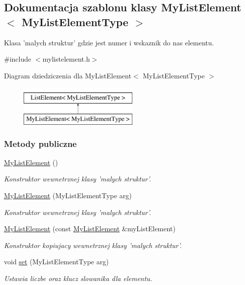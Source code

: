 \hypertarget{class_my_list_element}{\subsection{Dokumentacja szablonu klasy My\-List\-Element$<$ My\-List\-Element\-Type $>$}
\label{class_my_list_element}
}


Klasa 'malych struktur' gdzie jest numer i wskaznik do nas elementu.  




{\ttfamily \#include $<$mylistelement.\-h$>$}

Diagram dziedziczenia dla My\-List\-Element$<$ My\-List\-Element\-Type $>$\begin{figure}[H]
\begin{center}
\leavevmode
\includegraphics[height=2.000000cm]{class_my_list_element}
\end{center}
\end{figure}
\subsubsection*{Metody publiczne}
\begin{DoxyCompactItemize}
\item 
\hyperlink{class_my_list_element_aa29e333d56f5d89abb204c7b68b036ba}{My\-List\-Element} ()
\begin{DoxyCompactList}\small\item\em Konstruktor wewnetrznej klasy 'malych struktur'. \end{DoxyCompactList}\item 
\hyperlink{class_my_list_element_ab5020e69556fc9cb03741e8208d11658}{My\-List\-Element} (My\-List\-Element\-Type arg)
\begin{DoxyCompactList}\small\item\em Konstruktor wewnetrznej klasy 'malych struktur'. \end{DoxyCompactList}\item 
\hyperlink{class_my_list_element_a250d7ebabc90be7274c1337abf83a70f}{My\-List\-Element} (const \hyperlink{class_my_list_element}{My\-List\-Element} \&my\-List\-Element)
\begin{DoxyCompactList}\small\item\em Konstruktor kopiujacy wewnetrznej klasy 'malych struktur'. \end{DoxyCompactList}\item 
void \hyperlink{class_my_list_element_a40450b8318abf532f299f267a3abd504}{set} (My\-List\-Element\-Type arg)
\begin{DoxyCompactList}\small\item\em Ustawia liczbe oraz klucz slowanika dla elementu. \end{DoxyCompactList}\end{DoxyCompactItemize}
